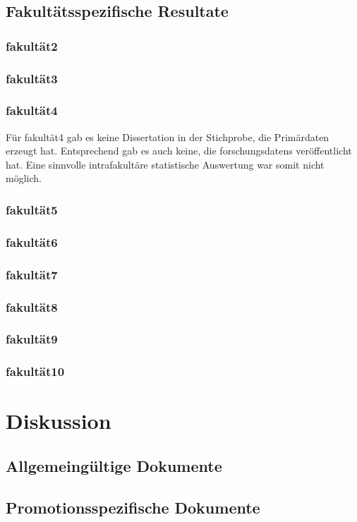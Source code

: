 \subsection{Fakultätsspezifische Resultate}\label{sec:luh-repo-results-specific}
\subsubsection{\gls{fakultät2}}
\subsubsection{\gls{fakultät3}}
\subsubsection{\gls{fakultät4}}
Für \gls{fakultät4} gab es keine Dissertation in der Stichprobe, die Primärdaten erzeugt hat.
Entsprechend gab es auch keine, die \glspl{forschungsdaten} veröffentlicht hat.
Eine sinnvolle intrafakultäre statistische Auswertung war somit nicht möglich.

\subsubsection{\gls{fakultät5}}
\subsubsection{\gls{fakultät6}}
\subsubsection{\gls{fakultät7}}
\subsubsection{\gls{fakultät8}}
\subsubsection{\gls{fakultät9}}
\subsubsection{\gls{fakultät10}}

\section{Diskussion}\label{sec:luh-repo-discussion}
\subsection{Allgemeingültige Dokumente}\label{sec:luh-repo-discussion-general}
\subsection{Promotionsspezifische Dokumente}\label{sec:luh-repo-discussion-specific}

